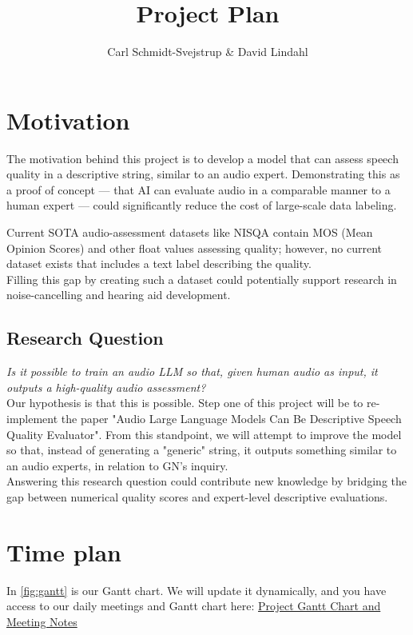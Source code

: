 \documentclass{article}
\title{Project Plan}
\author{Carl Schmidt-Svejstrup \& David Lindahl}
\begin{document}
\maketitle

\section*{Motivation}

The motivation behind this project is to develop a model that can assess speech quality in a descriptive string, similar to an audio expert. Demonstrating this as a proof of concept — that AI can evaluate audio in a comparable manner to a human expert — could significantly reduce the cost of large-scale data labeling.

Current SOTA audio-assessment datasets like NISQA contain MOS (Mean Opinion Scores) and other float values assessing quality; however, no current dataset exists that includes a text label describing the quality.\\
Filling this gap by creating such a dataset could potentially support research in noise-cancelling and hearing aid development.

\subsection*{Research Question}
\textit{Is it possible to train an audio LLM so that, given human audio as input, it outputs a high-quality audio assessment?}\\

Our hypothesis is that this is possible. Step one of this project will be to  re-implement the paper "Audio Large Language Models Can Be Descriptive Speech Quality Evaluator"\cite{chen2025audio}. From this standpoint, we will attempt to improve the model so that, instead of generating a "generic" string, it outputs something similar to an audio experts, in relation to GN's inquiry.\\

Answering this research question could contribute new knowledge by bridging the gap between numerical quality scores and expert-level descriptive evaluations.

\section*{Time plan}

In \autoref{fig:gantt} is our Gantt chart. We will update it dynamically, and you have access to our daily meetings and Gantt chart here:
\href{https://docs.google.com/document/d/1wSG3lSkr7cuSwWMX_2JGA9z1oDuxmNTsCSVygoZOwdk}{Project Gantt Chart and Meeting Notes}
\end{document}
